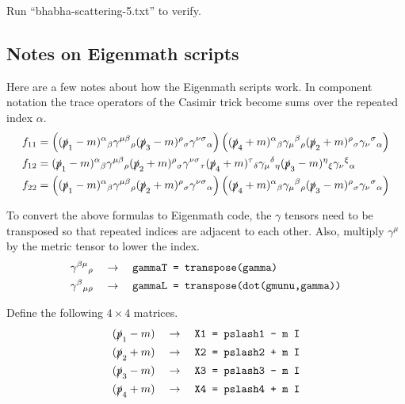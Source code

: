 \documentclass[12pt]{article}
\begin{document}
\bigskip
\noindent
Run ``bhabha-scattering-5.txt'' to verify.

\subsection*{Notes on Eigenmath scripts}
Here are a few notes about how the Eigenmath scripts work.
In component notation the trace operators of the Casimir trick become sums over the repeated index $\alpha$.
\begin{align*}
f_{11}&=
\left(
(\slashed{p}_1-m)^\alpha{}_\beta
\gamma^{\mu\beta}{}_\rho
(\slashed{p}_3-m)^\rho{}_\sigma
\gamma^{\nu\sigma}{}_\alpha
\right)
\left(
(\slashed{p}_4+m)^\alpha{}_\beta
\gamma_\mu{}^\beta{}_\rho
(\slashed{p}_2+m)^\rho{}_\sigma
\gamma_\nu{}^\sigma{}_\alpha
\right)
\\
f_{12}&=
(\slashed{p}_1-m)^\alpha{}_\beta
\gamma^{\mu\beta}{}_\rho
(\slashed{p}_2+m)^\rho{}_\sigma
\gamma^{\nu\sigma}{}_\tau
(\slashed{p}_4+m)^\tau{}_\delta
\gamma_\mu{}^\delta{}_\eta
(\slashed{p}_3-m)^\eta{}_\xi
\gamma_\nu{}^\xi{}_\alpha
\\
f_{22}&=
\left(
(\slashed{p}_1-m)^\alpha{}_\beta
\gamma^{\mu\beta}{}_\rho
(\slashed{p}_2+m)^\rho{}_\sigma
\gamma^{\nu\sigma}{}_\alpha
\right)
\left(
(\slashed{p}_4+m)^\alpha{}_\beta
\gamma_\mu{}^\beta{}_\rho
(\slashed{p}_3-m)^\rho{}_\sigma
\gamma_\nu{}^\sigma{}_\alpha
\right)
\end{align*}

\noindent
To convert the above formulas to Eigenmath code,
the $\gamma$ tensors need to be transposed
so that repeated indices are adjacent to each other.
Also, multiply $\gamma^\mu$ by the metric tensor to lower the index.
\begin{align*}
\gamma^{\beta\mu}{}_\rho\quad&\rightarrow\quad
\text{\tt gammaT = transpose(gamma)}\\
\gamma^\beta{}_{\mu\rho}\quad&\rightarrow\quad
\text{\tt gammaL = transpose(dot(gmunu,gamma))}
\end{align*}

\noindent
Define the following $4\times4$ matrices.
\begin{align*}
(\slashed{p}_1-m)\quad&\rightarrow\quad\text{\tt X1 = pslash1 - m I}\\
(\slashed{p}_2+m)\quad&\rightarrow\quad\text{\tt X2 = pslash2 + m I}\\
(\slashed{p}_3-m)\quad&\rightarrow\quad\text{\tt X3 = pslash3 - m I}\\
(\slashed{p}_4+m)\quad&\rightarrow\quad\text{\tt X4 = pslash4 + m I}
\end{align*}
\end{document}
